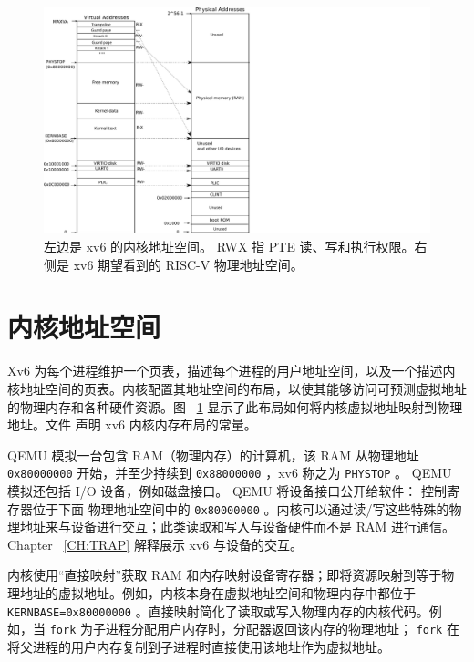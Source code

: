    \begin{figure}[h]
\centering
 \includegraphics[scale=0.65]{fig/xv6_layout.pdf}
\caption{左边是 xv6 的内核地址空间。
  {    \sf       \small{RWX}      }  指 PTE 读、写和执行权限。右侧是 xv6 期望看到的 RISC-V 物理地址空间。  }
\label{fig:xv6_layout}
\end{figure}   
    \section{内核地址空间  }    Xv6 为每个进程维护一个页表，描述每个进程的用户地址空间，以及一个描述内核地址空间的页表。内核配置其地址空间的布局，以使其能够访问可预测虚拟地址的物理内存和各种硬件资源。图~    \ref{fig:xv6_layout}    显示了此布局如何将内核虚拟地址映射到物理地址。文件
        声明 xv6 内核内存布局的常量。  

QEMU 模拟一台包含 RAM（物理内存）的计算机，该 RAM 从物理地址    \texttt{0x80000000}    开始，并至少持续到    \texttt{0x88000000}    ，xv6 称之为    \texttt{PHYSTOP}    。 QEMU 模拟还包括 I/O 设备，例如磁盘接口。 QEMU 将设备接口公开给软件：
        控制寄存器位于下面
 物理地址空间中的    \texttt{0x80000000}   。内核可以通过读/写这些特殊的物理地址来与设备进行交互；此类读取和写入与设备硬件而不是 RAM 进行通信。 Chapter~    \ref{CH:TRAP}    解释展示 xv6 与设备的交互。  

内核使用“直接映射”获取 RAM 和内存映射设备寄存器；即将资源映射到等于物理地址的虚拟地址。例如，内核本身在虚拟地址空间和物理内存中都位于    \lstinline{KERNBASE=0x80000000}   。直接映射简化了读取或写入物理内存的内核代码。例如，当   \lstinline{fork}   为子进程分配用户内存时，分配器返回该内存的物理地址；
    \lstinline{fork}    在将父进程的用户内存复制到子进程时直接使用该地址作为虚拟地址。  


